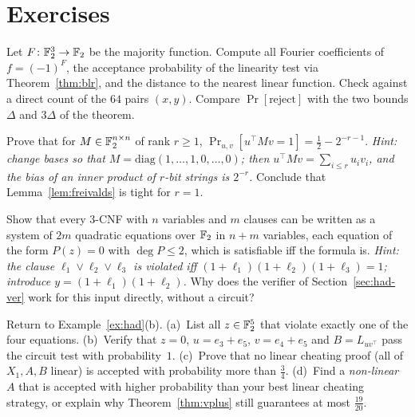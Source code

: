 \section*{Exercises}

\begin{exercise}[\stars{$\star$}]\label{ex:maj3}
Let $F\colon\mathbb{F}_2^3\to\mathbb{F}_2$ be the majority function.  Compute all Fourier coefficients of $f=(-1)^F$, the acceptance probability of the linearity test via Theorem~\ref{thm:blr}, and the distance to the nearest linear function.  Check against a direct count of the $64$ pairs $(x,y)$.
Compare $\Pr[\text{reject}]$ with the two bounds $\Delta$ and $3\Delta$ of the theorem.
\end{exercise}

\begin{exercise}[\stars{$\star$}]\label{ex:frank}
Prove that for $M\in\mathbb{F}_2^{n\times n}$ of rank $r\ge1$, $\Pr_{u,v}[u^\top Mv=1]=\tfrac12-2^{-r-1}$.  \emph{Hint: change bases so that $M=\mathrm{diag}(1,\dots,1,0,\dots,0)$; then $u^\top Mv=\sum_{i\le r}u_iv_i$, and the bias of an inner product of $r$-bit strings is $2^{-r}$.}
Conclude that Lemma~\ref{lem:freivalds} is tight for $r=1$.
\end{exercise}

\begin{exercise}[\stars{$\star$}]\label{ex:quadeq}
Show that every $3$-CNF with $n$ variables and $m$ clauses can be written as a system of $2m$ quadratic equations over $\mathbb{F}_2$ in $n+m$ variables, each equation of the form $P(z)=0$ with $\deg P\le2$, which is satisfiable iff the formula is.
\emph{Hint: the clause $\ell_1\vee\ell_2\vee\ell_3$ is violated iff $(1+\ell_1)(1+\ell_2)(1+\ell_3)=1$; introduce $y=(1+\ell_1)(1+\ell_2)$.}  Why does the verifier of Section~\ref{sec:had-ver} work for this input directly, without a circuit?
\end{exercise}

\begin{exercise}[\stars{$\star\star$}]\label{ex:had-cheat}
Return to Example~\ref{ex:had}(b).  (a)~List all $z\in\mathbb{F}_2^5$ that violate exactly one of the four equations.  (b)~Verify that $z=0$, $u=e_3+e_5$, $v=e_4+e_5$ and $B=L_{uv^\top}$ pass the circuit test with probability~$1$.
(c)~Prove that no linear cheating proof (all of $X_1,A,B$ linear) is accepted with probability more than $\tfrac34$.  (d)~Find a \emph{non-linear} $A$ that is accepted with higher probability than your best linear cheating strategy, or explain why Theorem~\ref{thm:vplus} still guarantees at most $\tfrac{19}{20}$.
\end{exercise}

